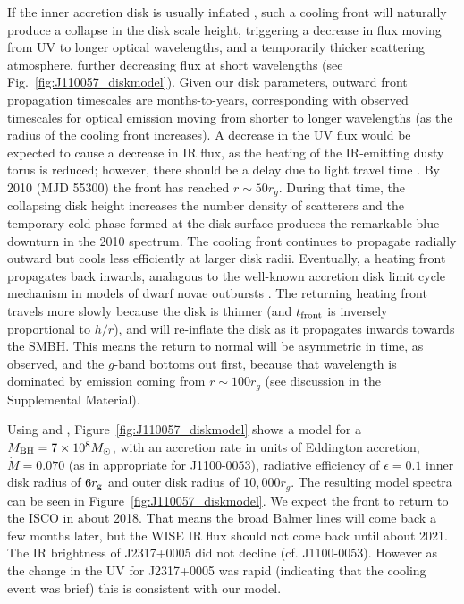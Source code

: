 \documentclass{nature}
\begin{document}
If the inner accretion disk is usually inflated \cite[see e.g.,
][]{Sirko_Goodman2003, Thompson2005, Hopkins_Quataert2011}, such a
cooling front will naturally produce a collapse in the disk scale
height, 
triggering a decrease in flux moving from UV to longer optical
wavelengths, and a temporarily thicker scattering atmosphere, further
decreasing flux at short wavelengths (see
Fig.~\ref{fig:J110057_diskmodel}). 
Given our disk parameters,
outward front propagation timescales are months-to-years,
corresponding with observed timescales for
optical emission moving from shorter to longer wavelengths (as the
radius of the cooling front increases). A
decrease in the UV flux would be expected to cause a decrease in IR
flux, as the heating of the IR-emitting dusty torus is reduced;
however, there should be a delay due to light travel time
\cite[e.g., ][]{Jun2015}.
By 2010 (MJD 55300) the front has reached $r\sim50
r_{g}$. During that time, the collapsing disk height increases the
number density of scatterers and the temporary cold phase formed
at the disk surface produces the remarkable blue downturn in the 2010
spectrum. The cooling front continues to propagate radially outward
but cools less efficiently at larger disk radii. Eventually, a heating
front propagates back inwards, analagous to the well-known accretion
disk limit cycle mechanism in models of dwarf novae outbursts
\cite[e.g., ][]{Cannizzo1998}. The returning heating front travels
more slowly because the disk is thinner (and $t_{\rm front}$ is
inversely proportional to $h/r$), and will re-inflate the disk as it
propagates inwards towards the SMBH. This means the return to normal
will be asymmetric in time, as observed, and the $g$-band bottoms out
first, because that wavelength is dominated by emission coming from
$r\sim100r_{g}$ (see discussion in the Supplemental Material).

Using \cite{Ford2018} and \cite{Sirko_Goodman2003},
Figure~\ref{fig:J110057_diskmodel} shows a model for a $M_{\rm
BH}=7\times 10^{8} M_{\odot}$, with an accretion rate in units of
Eddington accretion, $\dot{M}=0.070$ (as in appropriate for
J1100-0053), radiative efficiency of $\epsilon=0.1$ inner disk radius
of $6r_{\rm g}$ and outer disk radius of $10,000 r_{g}$. The resulting
model spectra can be seen in Figure~\ref{fig:J110057_diskmodel}.  We
expect the front to return to the ISCO in about 2018. That means the
broad Balmer lines will come back a few months later, but the WISE IR
flux should not come back until about 2021. The IR brightness of
J2317+0005 did not decline (cf. J1100-0053). However as the change in
the UV for J2317+0005 was rapid (indicating that the cooling event
was brief) this is consistent with our model.
\end{document}
